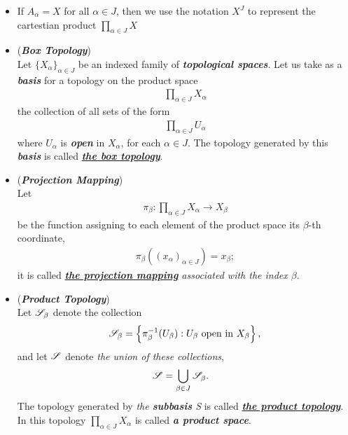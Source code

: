 \documentclass[11pt]{article}
\begin{document}
\begin{itemize}
\item \begin{remark}
If $A_{\alpha} = X$ for all $\alpha \in J$, then we use the notation $X^{J}$ to represent the cartestian product $\prod_{\alpha \in J}X$
\end{remark}

\item \begin{definition} (\emph{\textbf{Box Topology}})\\
Let $\{X_{\alpha}\}_{\alpha \in J}$ be an indexed family of \emph{\textbf{topological spaces}}. Let us take as a \emph{\textbf{basis}} for a topology on the product space
\begin{align*}
\prod_{\alpha \in J} X_{\alpha}
\end{align*}
the collection of all sets of the form
\begin{align*}
\prod_{\alpha \in J} U_{\alpha}
\end{align*}
where $U_{\alpha}$ is \emph{\textbf{open}} in $X_{\alpha}$, for each $\alpha \in J$. The topology generated by this \emph{\textbf{basis}} is called \underline{\emph{\textbf{the box topology}}}.
\end{definition}

\item \begin{definition} (\emph{\textbf{Projection Mapping}})\\
Let
\begin{align*}
\pi_{\beta}: \prod_{\alpha \in J} X_{\alpha} \rightarrow X_{\beta}
\end{align*}
be the function assigning to each element of the product space its $\beta$-th coordinate,
\begin{align*}
\pi_{\beta}((x_{\alpha})_{\alpha \in J}) = x_{\beta};
\end{align*}
it is called \emph{\underline{\textbf{the projection mapping}} associated with the index $\beta$}.
\end{definition}

\item \begin{definition} (\emph{\textbf{Product Topology}})\\
Let ${\mathscr S}_\beta$ denote the collection
\begin{align*}
{\mathscr S}_\beta = \left\{ \pi_\beta^{-1}(U_\beta): U_{\beta}\text{ open in }X_\beta\right\},
\end{align*}
and let ${\mathscr S}$ denote \emph{the union of these collections},
\begin{align*}
{\mathscr S} &= \bigcup_{\beta \in J} {\mathscr S}_\beta.
\end{align*}
The topology generated by \emph{the \textbf{subbasis} S} is called \underline{\emph{\textbf{the product topology}}}. In this 
topology $\prod_{\alpha \in J} X_{\alpha}$ is called \emph{\textbf{a product space}}.
\end{definition}


\end{itemize}
\end{document}
